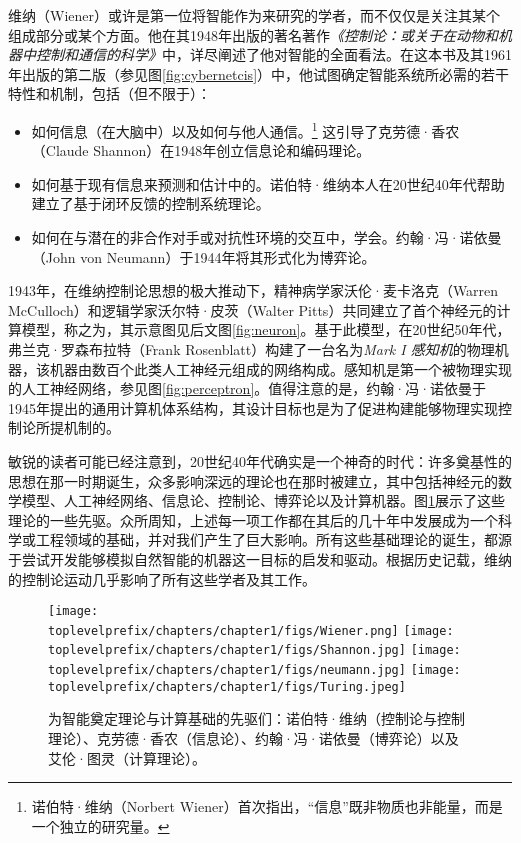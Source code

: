 \documentclass[../../book-main_zh.tex]{subfiles}
\begin{document}
维纳（Wiener）或许是第一位将智能作为{}来研究的学者，而不仅仅是关注其某个组成部分或某个方面。他在其1948年出版的著名著作{\em《控制论：或关于在动物和机器中控制和通信的科学》}\cite{Wiener-Cybernetics-1948}中，详尽阐述了他对智能的全面看法。在这本书及其1961年出版的第二版\cite{Wiener-Cybernetics-1961}（参见图\ref{fig:cybernetcis}）中，他试图确定智能系统所必需的若干特性和机制，包括（但不限于）：
\begin{itemize}
    \item 如何{}信息（在大脑中）以及如何与他人通信。\footnote{诺伯特·维纳（Norbert Wiener）首次指出，“信息”既非物质也非能量，而是一个独立的研究量。} 这引导了克劳德·香农（Claude Shannon）在1948年创立信息论和编码理论。
    \item 如何基于现有信息来{}预测和估计中的{}。诺伯特·维纳本人在20世纪40年代帮助建立了基于闭环反馈的控制系统理论。
    \item 如何在与潜在的非合作对手或对抗性环境的交互中，学会{}。约翰·冯·诺依曼（John von Neumann）于1944年将其形式化为博弈论。
\end{itemize}
1943年，在维纳控制论思想的极大推动下，精神病学家沃伦·麦卡洛克（Warren McCulloch）和逻辑学家沃尔特·皮茨（Walter Pitts）共同建立了首个神经元的计算模型\cite{McCulloch-Pitts}，称之为{}，其示意图见后文图\ref{fig:neuron}。基于此模型，在20世纪50年代，弗兰克·罗森布拉特（Frank Rosenblatt）构建了一台名为{\em Mark I 感知机}的物理机器，该机器由数百个此类人工神经元组成的网络构成。感知机是第一个被物理实现的人工神经网络，参见图\ref{fig:perceptron}。值得注意的是，约翰·冯·诺依曼于1945年提出的通用计算机体系结构，其设计目标也是为了促进构建能够物理实现控制论所提机制的{}。

敏锐的读者可能已经注意到，20世纪40年代确实是一个神奇的时代：许多奠基性的思想在那一时期诞生，众多影响深远的理论也在那时被建立，其中包括神经元的数学模型、人工神经网络、信息论、控制论、博弈论以及计算机器。图\ref{fig:god-fathers}展示了这些理论的一些先驱。众所周知，上述每一项工作都在其后的几十年中发展成为一个科学或工程领域的基础，并对我们产生了巨大影响。所有这些基础理论的诞生，都源于尝试开发能够模拟自然智能的机器这一目标的启发和驱动。根据历史记载，维纳的控制论运动几乎影响了所有这些学者及其工作。
\begin{figure}
    \centering
    \texttt{[image: \\toplevelprefix/chapters/chapter1/figs/Wiener.png]}
    \texttt{[image: \\toplevelprefix/chapters/chapter1/figs/Shannon.jpg]}
    \texttt{[image: \\toplevelprefix/chapters/chapter1/figs/neumann.jpg]}
    \texttt{[image: \\toplevelprefix/chapters/chapter1/figs/Turing.jpeg]}
    \caption{为智能奠定理论与计算基础的先驱们：诺伯特·维纳（控制论与控制理论）、克劳德·香农（信息论）、约翰·冯·诺依曼（博弈论）以及艾伦·图灵（计算理论）。}
    \label{fig:god-fathers}
\end{figure}
\end{document}
